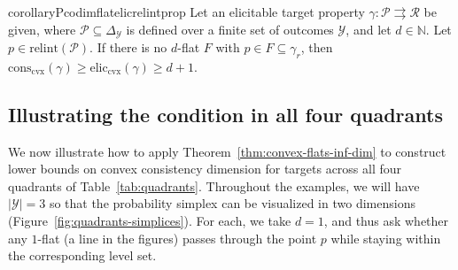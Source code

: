 \documentclass[11pt]{article} %
\newcommand{\simplex}{\Delta_\Y}
\newcommand{\relint}[1]{\mathrm{relint}(#1)}
\newcommand{\eliccvx}{\mathrm{elic}_\mathrm{cvx}}
\newcommand{\conscvx}{\mathrm{cons}_\mathrm{cvx}}
\newcommand{\Pcodimension}{$\mathcal{P}$-codimension\,}
\renewcommand{\L}{\mathcal{L}}
\newcommand{\Lcvx}{\mathcal{L}^{\mathrm{cvx}}}
\newcommand{\R}{\mathcal{R}}
\renewcommand{\P}{\mathcal{P}}
\newcommand{\Y}{\mathcal{Y}}
\newcommand{\toto}{\rightrightarrows}
\begin{document}
\begin{restatable}{corollary}{Pcodimflatelicrelintprop}\label{cor:Pcodim-flat-elic-relint-prop}
	Let an elicitable target property $\gamma:\P \toto \R$ be given, where $\P\subseteq\simplex$ is defined over a finite set of outcomes $\Y$, and let $d\in\mathbb N$.
	Let $p \in \relint{\P}$.
	If there is no $d$-flat $F$ with $p \in F \subseteq \gamma_r$, then $\conscvx(\gamma) \geq \eliccvx(\gamma) \geq d + 1$.%
\end{restatable}



\subsection{Illustrating the condition in all four quadrants}
\label{sec:illustration}
We now illustrate how to apply Theorem~\ref{thm:convex-flats-inf-dim} to construct lower bounds on convex consistency dimension for targets across all four quadrants of Table~\ref{tab:quadrants}.
Throughout the examples, we will have $|\Y|=3$ so that the probability simplex can be visualized in two dimensions (Figure~\ref{fig:quadrants-simplices}).
For each, we take $d=1$, and thus ask whether any $1$-flat (a line in the figures) passes through the point $p$ while staying within the corresponding level set.
\end{document}
